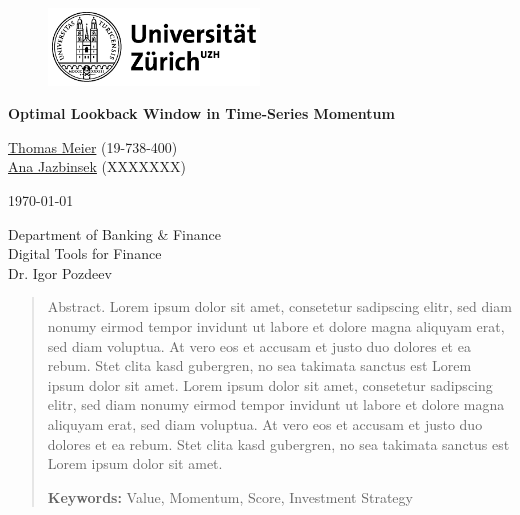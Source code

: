\documentclass[a4paper,12pt,twoside]{article}
\begin{document}
	
	\begin{titlepage}
		\centering
		\begin{figure}[!h]
			\centering
			\includegraphics[width=0.5\textwidth]{UZH}
		\end{figure}
		\Large{\textbf{Optimal Lookback Window in Time-Series Momentum}\\}

		
		\vfill
		
		\large{\href{mailto:thomas.meier6@uzh.ch}{Thomas Meier} (19-738-400) \\
				\href{mailto:thomas.meier6@uzh.ch}{Ana Jazbinsek} (XXXXXXX)\\}
		
		\vfill
			
		\large{\today}
		
		\vfill
		\vfill
	
		\large{Department of Banking \& Finance \\ Digital Tools for Finance \\ Dr. Igor Pozdeev\\ }
	
		\vfill
		\begin{abstract}
			Abstract. Lorem ipsum dolor sit amet, consetetur sadipscing elitr, sed diam nonumy eirmod tempor invidunt ut labore et dolore magna aliquyam erat, sed diam voluptua. At vero eos et accusam et justo duo dolores et ea rebum. Stet clita kasd gubergren, no sea takimata sanctus est Lorem ipsum dolor sit amet. Lorem ipsum dolor sit amet, consetetur sadipscing elitr, sed diam nonumy eirmod tempor invidunt ut labore et dolore magna aliquyam erat, sed diam voluptua. At vero eos et accusam et justo duo dolores et ea rebum. Stet clita kasd gubergren, no sea takimata sanctus est Lorem ipsum dolor sit amet.
			
			\vspace{3mm}
			
			\textbf{Keywords:} Value, Momentum, Score, Investment Strategy
		\end{abstract}
		
		
	\end{titlepage}

    \clearpage	
    \thispagestyle{empty}\mbox{}
    \clearpage
\end{document}
